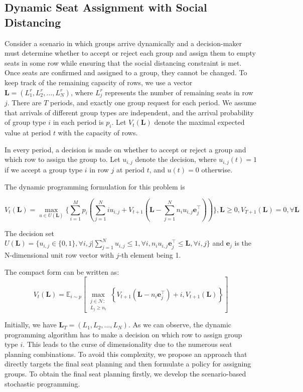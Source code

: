 \subsection{Dynamic Seat Assignment with Social Distancing}\label{sec_dynamic}
Consider a scenario in which groups arrive dynamically and a decision-maker must determine whether to accept or reject each group and assign them to empty seats in some row while ensuring that the social distancing constraint is met. Once seats are confirmed and assigned to a group, they cannot be changed. To keep track of the remaining capacity of rows, we use a vector $\mathbf{L} = (L_1^r, L_2^r, \ldots, L_N^r)$, where $L_j^r$ represents the number of remaining seats in row $j$. There are $T$ periods, and exactly one group request for each period. We assume that arrivals of different group types are independent, and the arrival probability of group type $i$ in each period is $p_i$. Let $V_t(\mathbf{L})$ denote the maximal expected value at period $t$ with the capacity of rows.

In every period, a decision is made on whether to accept or reject a group and which row to assign the group to. Let $u_{i,j}$ denote the decision, where $u_{i,j}(t) = 1$ if we accept a group type $i$ in row $j$ at period $t$, and $u(t) = 0$ otherwise.

The dynamic programming formulation for this problem is

$$V_{t}(\mathbf{L}) = \max_{u \in U(\mathbf{L})}\{ \sum_{i=1}^{M} p_i ( \sum_{j=1}^{N} i u_{i,j} + V_{t+1}(\mathbf{L}- \sum_{j=1}^{N} n_i u_{i,j}\mathbf{e}_j^{\top} ))\}, \mathbf{L} \geq 0, V_{T+1}(\mathbf{L}) =0, \forall \mathbf{L}$$


The decision set $U(\mathbf{L}) = \{u_{i,j} \in\{0,1\}, \forall i,j| \sum_{j=1}^{N} u_{i,j} \leq 1, \forall i, n_{i}u_{i,j}\mathbf{e}_j^{\top} \leq \mathbf{L}, \forall i,j \}$ and $\mathbf{e}_j$ is the N-dimensional unit row vector with $j$-th element being 1.

The compact form can be written as:
$$V_{t}(\mathbf{L}) = \mathbb{E}_{i \sim p}\left[\max_{\substack{j \in \mathcal{N}: \\ L_j \geqslant n_{i}}}\left\{V_{t+1}\left(\mathbf{L}- n_{i}\mathbf{e}_j^{\top} \right)+ i, V_{t+1}(\mathbf{L})\right\}\right]$$


Initially, we have $\mathbf{L}_{T} = (L_1, L_2, \ldots, L_{N})$. As we can observe, the dynamic programming algorithm has to make a decision on which row to assign group type $i$. This leads to the curse of dimensionality due to the numerous seat planning combinations. To avoid this complexity, we propose an approach that directly targets the final seat planning and then formulate a policy for assigning groups. To obtain the final seat planning firstly, we develop the scenario-based stochastic programming.



